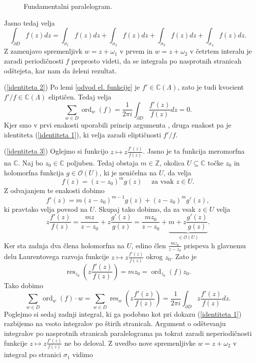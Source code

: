 \documentclass[mat1]{fmfdelo}
\newcommand{\Z}{\mathbb Z}
\newcommand{\C}{\mathbb C}
\newcommand{\om}{\omega}
\newcommand{\elf}{\C(\Lambda)}
\newcommand{\res}[2]{\operatorname{res}_{#1}(#2)}
\newcommand{\ord}[2]{\operatorname{ord}_{#1}(#2)}
\newcommand{\hol}[1]{\mathcal{O}(#1)}
\theoremstyle{definition}
\begin{document}
\begin{dokaz}
\begin{figure}[H]
        \caption{Fundamentalni paralelogram.}
        \label{fundamentalni paralelogram}
    \end{figure}


    Jasno tedaj velja
    \[
        \int_{\partial D} f(z)dz = \int_{\sigma_1} f(z)dz + \int_{\sigma_2} f(z)dz + \int_{\sigma_3} f(z)dz + \int_{\sigma_4} f(z)dz.
    \]
    Z zamenjavo spremenljivk $w = z + \om_1$ v prvem in $w = z + \om_2$ v četrtem interalu je zaradi periodičnosti $f$ preprosto videti, da se integrala po nasprotnih stranicah odštejeta, kar nam da želeni rezultat. 
    \\
    \par
    (\ref{identiteta 2}) Po lemi \ref{odvod el. funkcije} je $f' \in \elf$, zato je tudi kvocient $f'/f \in \elf$ eliptičen. Tedaj velja
    \[
        \sum_{w \in D} \ord{w}{f} = \frac{1}{2\pi i}\int_{\partial D} \frac{f'(z)}{f(z)}dz = 0. 
    \]
    Kjer smo v prvi enakosti uporabili princip argumenta \cite[Izrek 72]{Globevnik}, druga enakost pa je identiteta (\ref{identiteta 1}), ki velja zaradi eliptičnosti $f'/f$.
    \\
    \par
    (\ref{identiteta 3}) Oglejmo si funkcijo $z \mapsto z \frac{f'(z)}{f(z)}$. Jasno je ta funkcija meromorfna na $\C$. Naj bo $z_0 \in \C$ poljuben. Tedaj obstaja $m \in \Z$, okolica $U \subseteq \C$ točke $z_0$ in holomorfna funkcija $g \in \hol{U}$, ki je neničelna na $U$, da velja
    \[
        f(z) = (z - z_0)^m g(z) \quad \text{ za vsak $z \in U$.}  
    \]
    Z odvajanjem te enakosti dobimo
    \[
        f'(z) = m(z - z_0)^{m - 1} g(z) + (z - z_0)^m g'(z),
    \]
    ki pravtako velja povsod na $U$. Skupaj tako dobimo, da za vsak $z \in U$ velja
    \[
        z\frac{f'(z)}{f(z)} = \frac{mz}{z-z_0} + z\frac{g'(z)}{g(z)} = \frac{mz_0}{z-z_0} + \underbrace{m + z\frac{g'(z)}{g(z)}}_{\in \hol{U}}.
    \]
    Ker sta zadnja dva člena holomorfna na $U$, edino člen $\frac{mz_0}{z-z_0}$ prispeva h glavnemu delu Laurentovega razvoja funkcije $z \mapsto z \frac{f'(z)}{f(z)}$ okrog $z_0$. Zato je 
    \[
        \operatorname{res}_{z_0} \left( z \frac{f'(z)}{f(z)} \right) = mz_0 = \ord{z_0}{f}z_0.  
    \]
    Tako dobimo 
    \[
        \sum_{w \in D} \ord{w}{f}\cdot w 
        = \sum_{w \in D} \operatorname{res}_{w} \left( z \frac{f'(z)}{f(z)} \right)
        = \frac{1}{2 \pi i} \int_{\partial D} z \frac{f'(z)}{f(z)}dz. 
    \] 
    Poglejmo si sedaj zadnji integral, ki ga podobno kot pri dokazu (\ref{identiteta 1}) razbijemo na vsoto integralov po štirih stranicah. Argument o odštevanju integralov po nasprotnih stranicah paralelograma pa tokrat zaradi neperiodičnosti funkcije $z \mapsto z \frac{f'(z)}{f(z)}$ ne bo deloval. Z uvedbo nove spremenljivke $w = z + \omega_2$ v integral po stranici $\sigma_1$ vidimo

\end{dokaz}
\end{document}
